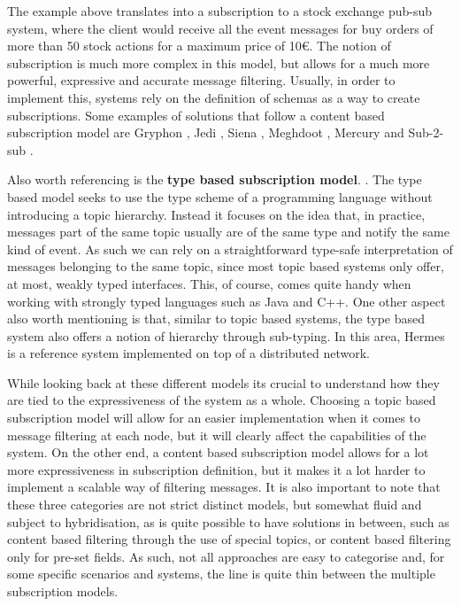 The example above translates into a subscription to a stock exchange
pub-sub system, where the client would receive all the event messages
for buy orders of more than 50 stock actions for a maximum price of
10\euro. The notion of subscription is much more complex in this
model, but allows for a much more powerful, expressive and accurate
message filtering. Usually, in order to implement this, systems rely on
the definition of schemas as a way to create subscriptions. Some
examples of solutions that follow a content based subscription model are
Gryphon \cite{Strom1998}, Jedi \cite{Cugola2001}, Siena \cite{Carzaniga2003},
Meghdoot \cite{Gupta2004}, Mercury \cite{Bharambe2002} and Sub-2-sub \cite{Voulgaris2005}.
\bigskip

Also worth referencing is the \textbf{type based subscription model}.
\cite{Eugster2000}. The type based model seeks to use the type
scheme of a programming language without introducing a topic hierarchy.
Instead it focuses on the idea that, in practice, messages part of the
same topic usually are of the same type and notify the same kind of
event. As such we can rely on a straightforward type-safe interpretation
of messages belonging to the same topic, since most topic based systems
only offer, at most, weakly typed interfaces. This, of course, comes
quite handy when working with strongly typed languages such as Java and
C++. One other aspect also worth mentioning is that, similar to topic
based systems, the type based system also offers a notion of hierarchy
through sub-typing. In this area, Hermes \cite{Pietzuch2002} is a
reference system implemented on top of a distributed network.

While looking back at these different models its crucial to understand
how they are tied to the expressiveness of the system as a whole.
Choosing a topic based subscription model will allow for an easier
implementation when it comes to message filtering at each node, but it
will clearly affect the capabilities of the system. On the other end, a
content based subscription model allows for a lot more expressiveness in
subscription definition, but it makes it a lot harder to implement a
scalable way of filtering messages. It is also important to note that
these three categories are not strict distinct models, but somewhat
fluid and subject to hybridisation, as is quite possible to have
solutions in between, such as content based filtering through the use of
special topics, or content based filtering only for pre-set fields. As
such, not all approaches are easy to categorise and, for some specific
scenarios and systems, the line is quite thin between the multiple
subscription models.

